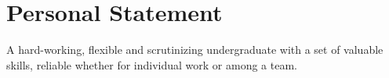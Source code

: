 \section{Personal Statement}
A hard-working, flexible and scrutinizing undergraduate with a set of valuable skills, reliable whether for individual work or among a team.
